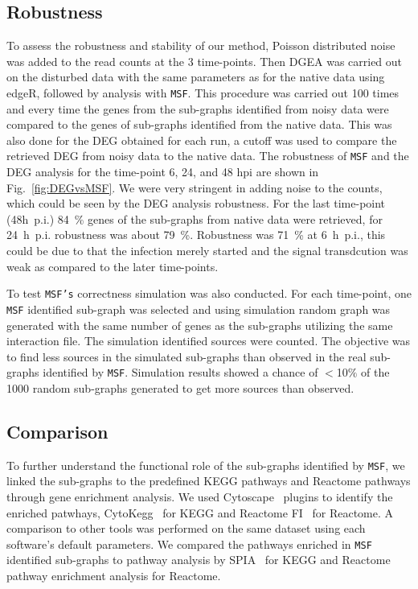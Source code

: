 \documentclass[10pt,a4paper,twocolumn]{article}
\begin{document}
 \subsection*{Robustness}
 
 To assess the robustness and stability of our method, Poisson
 distributed noise was added to the read counts at the 3 time-points. Then DGEA was
 carried out on the disturbed data with the same parameters as for the
 native data using edgeR, followed by analysis with \texttt{MSF}. This procedure was carried out 100 times
 and every time the genes from the sub-graphs identified from noisy
 data were compared to the genes of sub-graphs identified from the
 native data. This was also done for the DEG obtained for each run, a
 cutoff was used to compare the retrieved DEG from noisy data to the
 native data.  The robustness of \texttt{MSF} and the DEG analysis for
 the time-point 6, 24, and 48 hpi are shown in Fig.~\ref{fig:DEGvsMSF}. We were very stringent in
 adding noise to the counts, which could be seen by the DEG analysis
 robustness. For the last time-point (48h~p.i.) 84~\% genes of the
 sub-graphs from native data were retrieved, for 24~h~p.i. robustness was
 about 79~\%. Robustness was 71~\% at 6~h~p.i., this could be due to that the
 infection merely started and the signal transdcution was weak as
 compared to the later time-points.
 
 To test \texttt{MSF's} correctness simulation was also conducted. For each time-point, one \texttt{MSF} identified sub-graph was selected and  using simulation random graph was generated with the same number of genes as the sub-graphs utilizing the same interaction file. The simulation identified sources were counted. The objective
 was to find less sources in the simulated sub-graphs than observed in the real sub-graphs identified by
 \texttt{MSF}. Simulation results showed a chance of $<$10$\%$
 of the 1000 random sub-graphs generated to get more sources than observed.



\subsection*{Comparison}

To further understand the functional role of the sub-graphs identified
by \texttt{MSF}, we linked the sub-graphs to the predefined KEGG
pathways and Reactome pathways through gene enrichment analysis. We
used Cytoscape~\cite{Cyto} plugins to identify the enriched patwhays,
CytoKegg~\cite{Cytokegg} for KEGG and Reactome FI~\cite{Reactome} for
Reactome. A comparison to other tools was performed on the same dataset using each software's default parameters. We compared the pathways enriched in \texttt{MSF} identified
sub-graphs to pathway analysis by SPIA~\cite{Tarca} for KEGG and
Reactome pathway enrichment analysis for Reactome.
\end{document}
